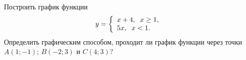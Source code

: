\begin{ex}
	\begin{condition}
		Построить график функции
		\[ y = 
			\left\{
			\begin{array}{l}
				x+4,\hspace{2mm}x\ge1, \\
				5x,\hspace{2mm}x<1.
			\end{array}
			\right.
		 \]
		 Определить графическим способом, проходит ли график функции через точки \( A(1;-1) \); \( B(-2;3) \) и \( C(4;3) \)?
	\end{condition}
\end{ex}